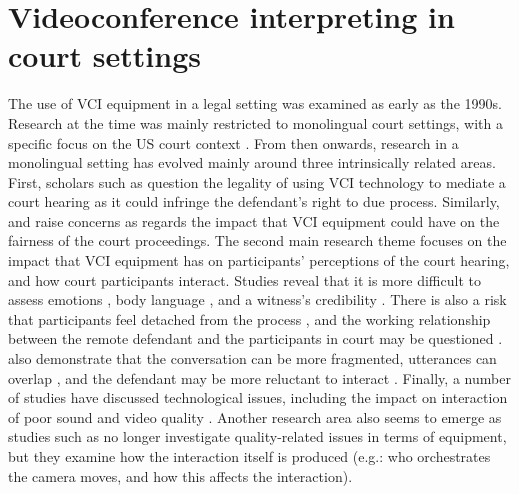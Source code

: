\documentclass[output=paper]{langsci/langscibook}
\begin{document}
\section{Videoconference interpreting in court settings}
The use of \textsc{VCI} equipment in a legal setting was examined as early as the 1990s. Research at the time was mainly restricted to monolingual court settings, with a specific focus on the US court context \citep{Radburn-Remfry1994,Thaxton1993}. From then onwards, research in a monolingual setting has evolved mainly around three intrinsically related areas. First, scholars such as \citet{Johnson2006} question the legality of using \textsc{VCI} technology to mediate a court hearing as it could infringe the defendant’s right to due process. Similarly, \citet{Radburn-Remfry1994} and \citet{Thaxton1993} raise concerns as regards the impact that \textsc{VCI} equipment could have on the fairness of the court proceedings. The second main research theme focuses on the impact that \textsc{VCI} equipment has on participants’ perceptions of the court hearing, and how court participants interact. Studies reveal that it is more difficult to assess emotions \citep{Radburn-Remfry1994}, body language \citep{Fullwood2008}, and a witness’s credibility \citep{Roth2000}. There is also a risk that participants feel detached from the process \citep{McKay2016}, and the working relationship between the remote defendant and the participants in court may be questioned \citep{Hodges2008}. \citet{Verdier2011} also demonstrate that the conversation can be more fragmented, utterances can overlap \citep{Licoppe2015}, and the defendant may be more reluctant to interact \citep{Licoppe2014}. Finally, a number of studies have discussed technological issues, including the impact on interaction of poor sound and video quality \citep{Haas2006, Plotnikoff2000}. Another research area also seems to emerge as studies such as \citet{Licoppe2013} no longer investigate quality-related issues in terms of equipment, but they examine how the interaction itself is produced (e.g.: who orchestrates the camera moves, and how this affects the interaction). 
\end{document}
